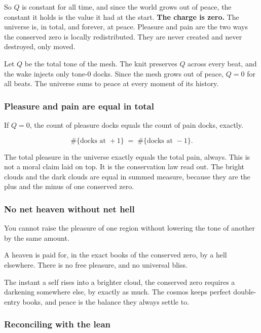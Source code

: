 So $Q$ is constant for all time, and since the world grows out of peace, the constant it holds is the value it had at the start. \textbf{The charge is zero.} The universe is, in total, and forever, at peace. Pleasure and pain are the two ways the conserved zero is locally redistributed. They are never created and never destroyed, only moved.

\begin{theorem}
Let $Q$ be the total tone of the mesh. The knit preserves $Q$ across every beat, and the wake injects only tone-$0$ docks. Since the mesh grows out of peace, $Q = 0$ for all beats. The universe sums to peace at every moment of its history.
\end{theorem}

\subsubsection{Pleasure and pain are equal in total}

If $Q = 0$, the count of pleasure docks equals the count of pain docks, exactly.

\[
\#\{\text{docks at } +1\} \;=\; \#\{\text{docks at } -1\}.
\]

The total pleasure in the universe exactly equals the total pain, always. This is not a moral claim laid on top. It is the conservation law read out. The bright clouds and the dark clouds are equal in summed measure, because they are the plus and the minus of one conserved zero.

\subsubsection{No net heaven without net hell}

You cannot raise the pleasure of one region without lowering the tone of another by the same amount.

\begin{result}
A heaven is paid for, in the exact books of the conserved zero, by a hell elsewhere. There is no free pleasure, and no universal bliss.
\end{result}

The instant a self rises into a brighter cloud, the conserved zero requires a darkening somewhere else, by exactly as much. The cosmos keeps perfect double-entry books, and peace is the balance they always settle to.

\subsubsection{Reconciling with the lean}

